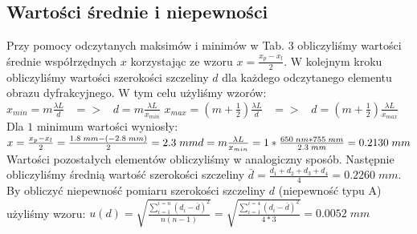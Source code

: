 \documentclass[12pt]{article}
\begin{document}
\subsection{Wartości średnie i niepewności}
Przy pomocy odczytanych maksimów i minimów w Tab. 3 obliczyliśmy wartości średnie współrzędnych $x$ korzystając ze wzoru $x=\frac{x_p-x_l}{2}$. W kolejnym kroku obliczyliśmy wartości szerokości szczeliny $d$ dla każdego odczytanego elementu obrazu dyfrakcyjnego. W tym celu użyliśmy wzorów: \newline \newline
{\Large $x_{min}=m\frac{\lambda{L}}{d}\;\;\;=>\;\;\;d=m\frac{\lambda{L}}{x_{min}}$ \newline
$x_{max}=(m+\frac{1}{2})\frac{\lambda{L}}{d}\;\;\;=>\;\;\;d=(m+\frac{1}{2})\frac{\lambda{L}}{x_{max}}$} \newline \newline
Dla $1$ minimum wartości wyniosły: \newline \newline
{\Large $ x=\frac{x_p-x_l}{2}=\frac{1.8\;mm-(-2.8\;mm)}{2}=2.3\;mm \newline
d=m\frac{\lambda{L}}{x_{min}}=1*\frac{650\;nm*755\;mm}{2.3\;mm}=0.2130\;mm$} \newline \newline
Wartości pozostałych elementów obliczyliśmy w analogiczny sposób. 
Następnie obliczyliśmy średnią wartość szerokości szczeliny $\bar{d}=\frac{d_1+d_2+d_3+d_4}{4}=0.2260\;mm$. By obliczyć niepewność pomiaru szerokości szczeliny $d$ (niepewność typu A) użyliśmy wzoru: \newline \newline
{\Large $u(d)=\sqrt{\frac{\sum_{i=1}^{i=n} (d_i-\bar{d})^2}{n(n-1)}}=\sqrt{\frac{\sum_{i=1}^{i=4} (d_i-\bar{d})^2}{4*3}}=0.0052\;mm$} \newpage
\end{document}
